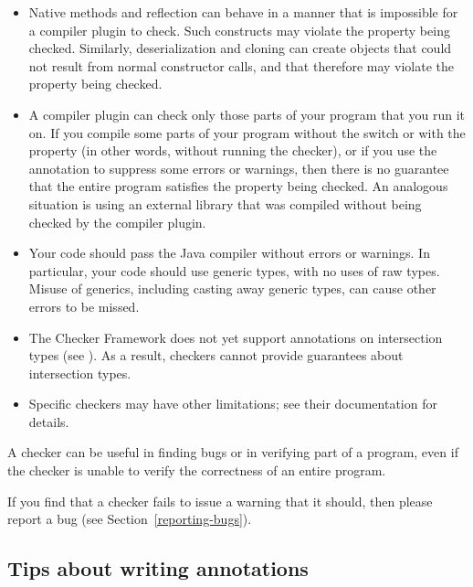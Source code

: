 \begin{itemize}

\item
  Native methods and reflection can behave in a manner that is impossible
  for a compiler plugin to check.  Such constructs may violate the
  property being checked.  Similarly, deserialization and cloning can
  create objects that could not result from normal constructor calls, and
  that therefore may violate the property being checked.

\item 
  A compiler plugin can check only those parts of your program that you run
  it on. If you compile some parts of your program without the
   switch or with the  property
  (in other words, without running the checker), or if you use the
   annotation to suppress some errors or warnings,
  then there is no guarantee that the entire program satisfies the property
  being checked.  An analogous situation is using an external library that
  was compiled without being checked by the compiler plugin.

\item 
  Your code should pass the Java compiler without errors or warnings.  In
  particular, your code should use generic types, with no uses of raw types.
  Misuse of generics, including casting away generic types, can cause other
  errors to be missed.

\item
  The Checker Framework does not yet support annotations on intersection
  types (see
  ).  As a result, checkers cannot provide guarantees about
  intersection types.

\item
  Specific checkers may have other limitations; see their documentation for
  details.

\end{itemize}

A checker can be useful in finding bugs or in verifying part of a
program, even if the checker is unable to verify the correctness of an
entire program.

If you find that a checker fails to issue a warning that it
should, then please report a bug (see Section~\ref{reporting-bugs}).


\subsection{Tips about writing annotations\label{tips-about-writing-annotations}}

